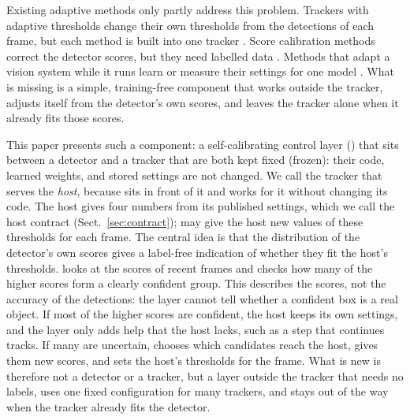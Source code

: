 Existing adaptive methods only partly address this problem. Trackers with adaptive thresholds
change their own thresholds from the detections of each frame, but each method is built into one
tracker \cite{ma2023adaptivebytetrack,shim2024adaptrack,act2026adaptive}. Score calibration methods
correct the detector scores, but they need labelled data \cite{kuppers2020detcalib}. Methods that
adapt a vision system while it runs learn or measure their settings for one model
\cite{han2022dynamic,jiang2018chameleon}. What is missing is a simple, training-free component that
works outside the tracker, adjusts itself from the detector's own scores, and leaves the tracker
alone when it already fits those scores.

This paper presents such a component: a self-calibrating control layer (\scl{}) that sits between
a detector and a tracker that are both kept fixed (frozen): their code, learned weights, and stored
settings are not changed. We call the tracker that \scl{} serves the \emph{host}, because \scl{}
sits in front of it and works for it without changing its code. The host gives \scl{} four numbers
from its published settings, which we call the host contract (Sect.~\ref{sec:contract}); \scl{}
may give the host new values of these thresholds for each frame. The central idea is that the
distribution of the detector's own scores gives a label-free indication of whether they fit the
host's thresholds. \scl{} looks at the scores of recent frames and checks how many of the higher
scores form a clearly confident group. This describes the scores, not the accuracy of the
detections: the layer cannot tell whether a confident box is a real object. If most of the higher
scores are confident, the host keeps its own settings, and the layer only adds help that the host
lacks, such as a step that continues tracks. If many are uncertain, \scl{} chooses which candidates
reach the host, gives them new scores, and sets the host's thresholds for the frame. What is new is therefore not
a detector or a tracker, but a layer outside the tracker that needs no labels, uses one fixed
configuration for many trackers, and stays out of the way when the tracker already fits the
detector.



